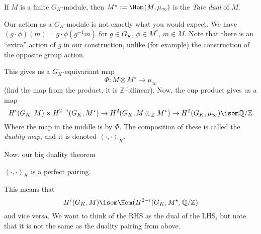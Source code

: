 \begin{definition}
	If \(M\) is a finite \(G_{K}\)-module, then \(M^{\star} :=
	\Hom_{} (M,\mu_{\infty})\) is the \textit{Tate dual} of \(M\).
\end{definition}

Our action as a \(G_{K}\)-module is not exactly what you would expect.
We have  \((g \cdot \phi)(m) = g \cdot \phi(g^{-1} m)\) for \(g \in G_{K}\),
\(\phi \in M^{*}\), \(m \in M\).
Note that there is an ``extra'' action of \(g\) in our construction,
unlike (for example) the construction of the opposite group action.

This gives us a \(G_{K}\)-equivariant map  
\[
\Phi : M \otimes M^{\star} \to \mu_{\infty}
\] 
(find the map from the product, it is \(\mathbb{Z}\)-bilinear).
Now, the cup product gives us a map
\[
	H^{i}(G_{K},M) \times H^{2-i}(G_{K},M^{\star})
	\to H^{2}(G_{K}, M \otimes_{Z} M^{\star})
	\to H^{2}(G_{K}, \mu_{\infty})
	\isom \mathbb{Q} / \mathbb{Z}
\] 
Where the map in the middle is by \(\Phi\).
The composition of these is called the \textit{duality map}, and it is 
denoted \(\left<\cdot,\cdot \right>_{K}\).

Now, our big duality theorem

\begin{theorem}
	\(\left<\cdot,\cdot\right>_{K}\) is a perfect pairing.
\end{theorem}

This means that 
\[
	H^{i}(G_{K},M) \isom \Hom_{} (H^{2-i}(G_{K},M^{\star},\mathbb{Q} / \mathbb{Z})
\] 
and vice versa.
We want to think of the RHS as the dual of the LHS, but note that it 
is not the same as the duality pairing from above. 





